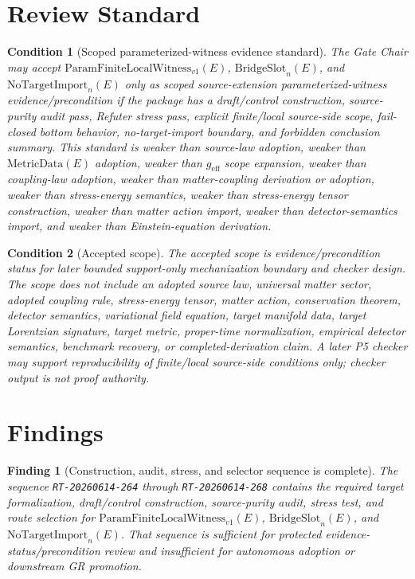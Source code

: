 \documentclass[11pt]{article}
\newcommand{\MetricData}{\mathrm{MetricData}}
\newcommand{\geff}{g_{\mathrm{eff}}}
\newcommand{\ParamWitness}{\mathrm{ParamFiniteLocalWitness}_{v1}}
\newcommand{\BridgeSlot}{\mathrm{BridgeSlot}_{n}}
\newcommand{\NoTargetImport}{\mathrm{NoTargetImport}_{n}}
\newtheorem{finding}{Finding}
\newtheorem{condition}{Condition}
\begin{document}
\section{Review Standard}

\begin{condition}[Scoped parameterized-witness evidence standard]
The Gate Chair may accept \(\ParamWitness(E)\), \(\BridgeSlot(E)\), and
\(\NoTargetImport(E)\) only as scoped source-extension parameterized-witness
evidence/precondition if the package has a draft/control construction,
source-purity audit pass, Refuter stress pass, explicit finite/local
source-side scope, fail-closed bottom behavior, no-target-import boundary, and
forbidden conclusion summary. This standard is weaker than source-law
adoption, weaker than \(\MetricData(E)\) adoption, weaker than \(\geff\) scope
expansion, weaker than coupling-law adoption, weaker than matter-coupling
derivation or adoption, weaker than stress-energy semantics, weaker than
stress-energy tensor construction, weaker than matter action import, weaker
than detector-semantics import, and weaker than Einstein-equation derivation.
\end{condition}

\begin{condition}[Accepted scope]
The accepted scope is evidence/precondition status for later bounded
support-only mechanization boundary and checker design. The scope does not
include an adopted source law, universal matter sector, adopted coupling rule,
stress-energy tensor, matter action, conservation theorem, detector semantics,
variational field equation, target manifold data, target Lorentzian signature,
target metric, proper-time normalization, empirical detector semantics,
benchmark recovery, or completed-derivation claim. A later P5 checker may
support reproducibility of finite/local source-side conditions only; checker
output is not proof authority.
\end{condition}

\section{Findings}

\begin{finding}[Construction, audit, stress, and selector sequence is complete]
The sequence \texttt{RT-20260614-264} through \texttt{RT-20260614-268}
contains the required target formalization, draft/control construction,
source-purity audit, stress test, and route selection for
\(\ParamWitness(E)\), \(\BridgeSlot(E)\), and \(\NoTargetImport(E)\). That
sequence is sufficient for protected evidence-status/precondition review and
insufficient for autonomous adoption or downstream GR promotion.
\end{finding}
\end{document}
